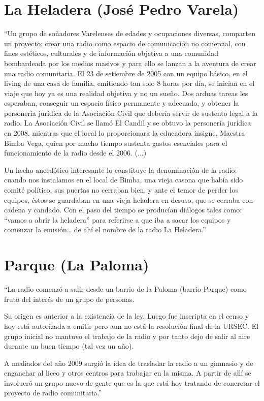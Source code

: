 \section*{La Heladera (José Pedro Varela)}
``Un grupo de soñadores Varelenses de edades y ocupaciones diversas, comparten un proyecto: crear una radio como espacio de comunicación no comercial, con fines estéticos, culturales y de información objetiva a una comunidad bombardeada por los medios masivos y para ello se lanzan a la aventura de crear una radio comunitaria. El 23 de setiembre de 2005 con un equipo básico, en el living de una casa de familia, emitiendo tan solo 8 horas por día, se inician en el viaje que hoy ya es una realidad objetiva y no un sueño. Dos arduas tareas les esperaban, conseguir un espacio físico permanente y adecuado, y obtener la personería jurídica de la Asociación Civil que debería servir de sustento legal a la radio. La Asociación Civil se llamó El Candil y se obtuvo la personería jurídica en 2008, mientras que el local lo proporcionara la educadora insigne, Maestra Bimba Vega, quien por mucho tiempo sustenta gastos esenciales para el funcionamiento de la radio desde el 2006. (...)

Un hecho anecdótico interesante lo constituye la denominación de la radio: cuando nos instalamos en el local de Bimba, una vieja casona que había sido comité político, sus puertas no cerraban bien, y ante el temor de perder los equipos, éstos se guardaban en una vieja heladera en desuso, que se cerraba con cadena y candado. Con el paso del tiempo se producían diálogos tales como: “vamos a abrir la heladera” para referirse a que iba a sacar los equipos y comenzar la emisión… de ahí el nombre de la radio La Heladera.''

\section*{Parque (La Paloma)}
``La radio comenzó a salir desde un barrio de la Paloma (barrio Parque) como fruto del interés de un grupo de personas.

Su origen es anterior a la existencia de la ley. Luego fue inscripta en el censo y hoy está autorizada a emitir pero aun no está la resolución final de la URSEC.
El grupo inicial no mantuvo el trabajo de la radio y por tanto dejo de salir al aire durante un buen tiempo (tal vez un año).

A mediados del año 2009 surgió la idea de trasladar la radio a un gimnasio y de enganchar al liceo y otros centros para trabajar en la misma. A partir de allí se involucró un grupo nuevo de gente que es la que está hoy tratando de concretar el proyecto de radio comunitaria.''

